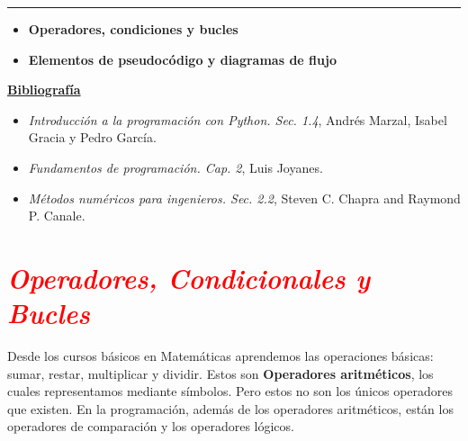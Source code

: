 \documentclass[12pt]{article}
\begin{document}
\thispagestyle{firstpage}
\vspace*{1.5cm}

\begin{center}
    \rule{\textwidth}{0.4pt}
\end{center}

\begin{itemize}[leftmargin=*,label=\textcolor{red}{\ensuremath{\blacktriangleright}}]
    \item \textbf{ Operadores, condiciones y bucles}
    \item \textbf{Elementos de pseudocódigo y diagramas de flujo}
\end{itemize}

\noindent
\textbf{\underline{Bibliografía}}
\begin{itemize}[leftmargin=*, label={\textcolor{blue}{$\bullet$}}]
    \item \textit{Introducción a la programación con Python. Sec. 1.4}, Andrés Marzal, Isabel Gracia y Pedro García.
    \item \textit{Fundamentos de programación. Cap. 2}, Luis Joyanes.
    \item \textit{Métodos numéricos para ingenieros. Sec. 2.2}, Steven C. Chapra and Raymond P. Canale.
\end{itemize}


\section*{\textcolor{red}{\textit{Operadores, Condicionales y Bucles}}}

Desde los cursos básicos en Matemáticas aprendemos las operaciones básicas: sumar, restar, 
multiplicar y dividir. Estos son \textbf{Operadores aritméticos}, los cuales representamos
mediante símbolos. Pero estos no son los únicos operadores que existen. 
En la programación, además de los operadores aritméticos, están 
los operadores de comparación y los operadores lógicos. 
\end{document}
